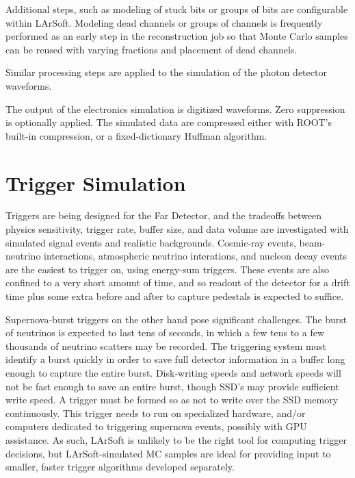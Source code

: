 Additional steps, such as modeling of stuck bits or groups of bits are configurable within LArSoft.
Modeling dead channels or groups of channels is frequently performed as an early step
in the reconstruction job so that Monte Carlo samples can be reused with varying fractions and placement
of dead channels.

Similar processing steps are applied to the simulation of the photon detector waveforms.

The output of the electronics simulation is digitized waveforms.  Zero suppression is optionally
applied.  The simulated data are compressed either with ROOT's built-in compression, or a fixed-dictionary
Huffman algorithm.

\section{Trigger Simulation}

Triggers are being designed for the Far Detector, and the tradeoffs between physics sensitivity,
trigger rate, buffer size, and data volume are investigated with simulated signal events and
realistic backgrounds.  Cosmic-ray events, beam-neutrino interactions, atmospheric neutrino interations,
and nucleon decay events are the easiest to trigger on, using energy-sum triggers.  These events
are also confined to a very short amount of time, and so readout of the detector for a drift time plus some
extra before and after to capture pedestals is expected to suffice.
 
 Supernova-burst triggers on the other hand pose significant challenges.  The burst of neutrinos is expected
to last tens of seconds, in which a few tens to a few thousands of neutrino scatters may be recorded.  The
triggering system must identify a burst quickly in order to save full detector information in a buffer
long enough to capture the entire burst.  Disk-writing speeds and network speeds will not be fast enough
to save an entire burst, though SSD's may provide sufficient write speed.  A trigger must be formed so 
as not to write over the SSD memory continuously.  This trigger needs to run on specialized hardware, and/or
computers dedicated to triggering supernova events, possibly with GPU assistance.  As such, LArSoft is
unlikely to be the right tool for computing trigger decisions, but LArSoft-simulated MC samples are
ideal for providing input to smaller, faster trigger algorithms developed separately.
